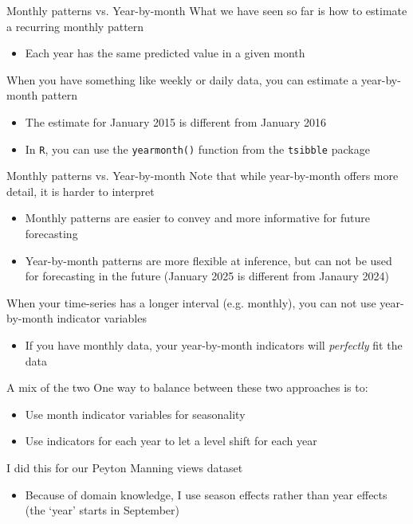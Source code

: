 \documentclass[aspectratio=169,t,11pt,table]{beamer}
\begin{document}
\begin{frame}{Monthly patterns vs. Year-by-month}
  What we have seen so far is how to estimate a recurring monthly pattern
  \begin{itemize}
    \item Each year has the same predicted value in a given month
  \end{itemize}

  \pause
  \bigskip
  When you have something like weekly or daily data, you can estimate a year-by-month pattern
  \begin{itemize}
    \item The estimate for January 2015 is different from January 2016
    \item In \texttt{R}, you can use the \texttt{yearmonth()} function from the \texttt{tsibble} package
  \end{itemize}
\end{frame}


\begin{frame}{Monthly patterns vs. Year-by-month}
  Note that while year-by-month offers more detail, it is harder to interpret
  \begin{itemize}
    \item Monthly patterns are easier to convey and more informative for future forecasting
    \item Year-by-month patterns are more flexible at inference, but can not be used for forecasting in the future (January 2025 is different from Janaury 2024)
  \end{itemize}

  \pause
  \bigskip
  When your time-series has a longer interval (e.g. monthly), you can not use year-by-month indicator variables
  \begin{itemize}
    \item If you have monthly data, your year-by-month indicators will \emph{perfectly} fit the data
  \end{itemize}
\end{frame}

\begin{frame}{A mix of the two}
  One way to balance between these two approaches is to:
  \begin{itemize}
    \item Use month indicator variables for seasonality
    
    \item Use indicators for each year to let a level shift for each year
  \end{itemize}

  \bigskip
  I did this for our Peyton Manning views dataset
  \begin{itemize}
    \item Because of domain knowledge, I use season effects rather than year effects (the `year' starts in September)
  \end{itemize}
\end{frame}
\end{document}
